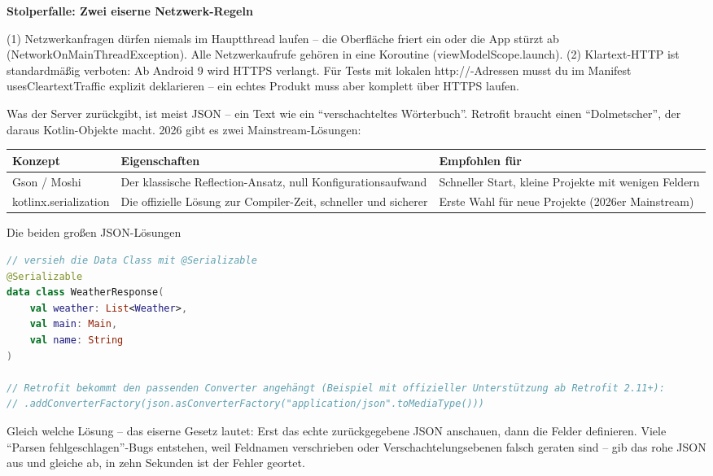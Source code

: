 \textbf{Stolperfalle: Zwei eiserne Netzwerk-Regeln}\par

(1) Netzwerkanfragen dürfen niemals im Hauptthread laufen – die Oberfläche friert ein oder die App stürzt ab (NetworkOnMainThreadException). Alle Netzwerkaufrufe gehören in eine Koroutine (viewModelScope.launch). (2) Klartext-HTTP ist standardmäßig verboten: Ab Android 9 wird HTTPS verlangt. Für Tests mit lokalen http://-Adressen musst du im Manifest usesCleartextTraffic explizit deklarieren – ein echtes Produkt muss aber komplett über HTTPS laufen.


Was der Server zurückgibt, ist meist JSON – ein Text wie ein “verschachteltes Wörterbuch”. Retrofit braucht einen “Dolmetscher”, der daraus Kotlin-Objekte macht. 2026 gibt es zwei Mainstream-Lösungen:

\begin{center}
\begin{tabularx}{\linewidth}{|X|X|X|}
\hline
\textbf{Konzept} & \textbf{Eigenschaften} & \textbf{Empfohlen für} \tabularnewline
\hline
Gson / Moshi & Der klassische Reflection-Ansatz, null Konfigurationsaufwand & Schneller Start, kleine Projekte mit wenigen Feldern \tabularnewline
kotlinx.serialization & Die offizielle Lösung zur Compiler-Zeit, schneller und sicherer & Erste Wahl für neue Projekte (2026er Mainstream) \tabularnewline
\hline
\end{tabularx}
\end{center}

\begin{center}\small\color{gray}Die beiden großen JSON-Lösungen\end{center}

\begin{lstlisting}[language=Kotlin]
// versieh die Data Class mit @Serializable
@Serializable
data class WeatherResponse(
    val weather: List<Weather>,
    val main: Main,
    val name: String
)

// Retrofit bekommt den passenden Converter angehängt (Beispiel mit offizieller Unterstützung ab Retrofit 2.11+):
// .addConverterFactory(json.asConverterFactory("application/json".toMediaType()))
\end{lstlisting}

Gleich welche Lösung – das eiserne Gesetz lautet: Erst das echte zurückgegebene JSON anschauen, dann die Felder definieren. Viele “Parsen fehlgeschlagen”-Bugs entstehen, weil Feldnamen verschrieben oder Verschachtelungsebenen falsch geraten sind – gib das rohe JSON aus und gleiche ab, in zehn Sekunden ist der Fehler geortet.

